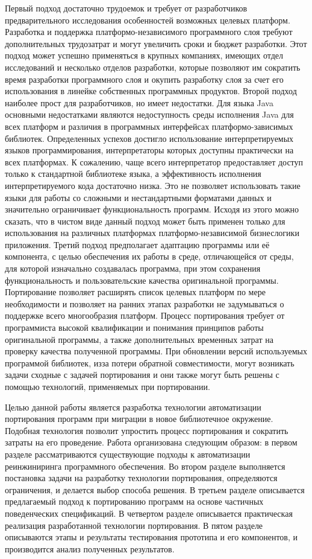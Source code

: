 Первый подход достаточно трудоемок и требует от разработчиков предварительного исследования особенностей возможных целевых платформ. Разработка и поддержка платформо-независимого программного слоя требуют дополнительных трудозатрат и могут увеличить сроки и бюджет разработки. Этот подход может успешно применяться в крупных компаниях, имеющих отдел исследований и несколько отделов разработки, которые позволяют им сократить время разработки программного слоя и окупить разработку слоя за счет его использования в линейке собственных программных продуктов.
Второй подход наиболее прост для разработчиков, но имеет недостатки. Для языка Java основными недостатками являются недоступность среды исполнения Java для всех платформ и различия в программных интерфейсах платформо-зависимых библиотек. Определенных успехов достигло использование интерпретируемых языков программирования, интерпретаторы которых доступны практически на всех платформах. К сожалению, чаще всего интерпретатор предоставляет доступ только к стандартной библиотеке языка, а эффективность исполнения интерпретируемого кода достаточно низка. Это не позволяет использовать такие языки для работы со сложными и нестандартными форматами данных и значительно ограничивает функциональность программ. Исходя из этого можно сказать, что в чистом виде данный подход может быть применен только для использования на различных платформах платформо-независимой бизнеслогики приложения.
Третий подход предполагает адаптацию программы или её компонента, с целью обеспечения их работы в среде, отличающейся от среды, для которой изначально создавалась программа, при этом сохранения функциональность и пользовательские качества оригинальной программы. Портирование позволяет расширять список целевых платформ по мере необходимости и позволяет на ранних этапах разработки не задумываться о поддержке всего многообразия платформ. Процесс портирования требует от программиста высокой квалификации и понимания принципов работы оригинальной программы, а также дополнительных временных затрат на проверку качества полученной программы.
При обновлении версий используемых программой библиотек, изза потери обратной совместимости, могут возникать задачи сходные с задачей портирования и они также могут быть решены с помощью технологий, применяемых при портировании.

Целью данной работы является разработка технологии автоматизации портирования программ при миграции в новое библиотечное окружение. Подобная технология позволит упростить процесс портирования и сократить затраты на его проведение.
Работа организована следующим образом: в первом разделе рассматриваются существующие подходы к автоматизации реинжиниринга программного обеспечения. Во втором разделе выполняется постановка задачи на разработку технологии портирования, определяются ограничения, и делается выбор способа решения. В третьем разделе описывается предлагаемый подход к портированию программ на основе частичных поведенческих спецификаций. В четвертом разделе описывается практическая реализация разработанной технологии портирования. В пятом разделе описываются этапы и результаты тестирования прототипа и его компонентов, и производится анализ полученных результатов.

